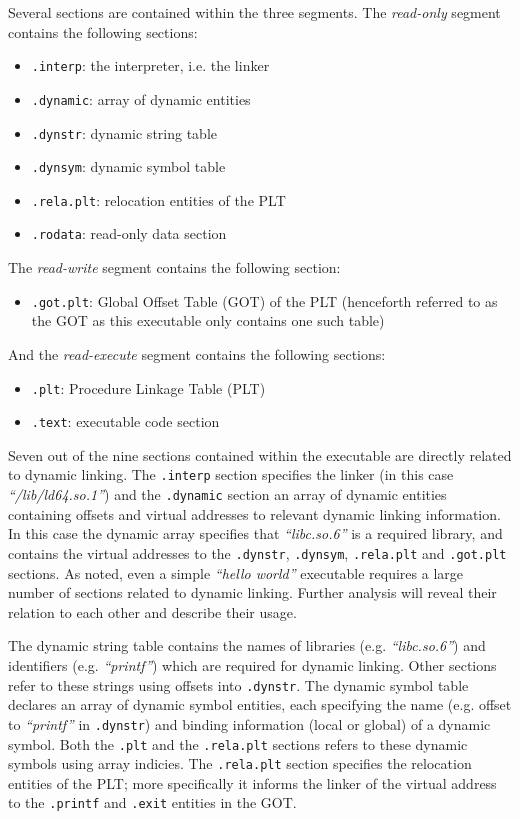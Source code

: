 Several sections are contained within the three segments. The \textit{read-only} segment contains the following sections:

\begin{itemize}
	\item \texttt{.interp}: the interpreter, i.e. the linker
	\item \texttt{.dynamic}: array of dynamic entities
	\item \texttt{.dynstr}: dynamic string table
	\item \texttt{.dynsym}: dynamic symbol table
	\item \texttt{.rela.plt}: relocation entities of the PLT
	\item \texttt{.rodata}: read-only data section
\end{itemize}

The \textit{read-write} segment contains the following section:

\begin{itemize}
	\item \texttt{.got.plt}: Global Offset Table (GOT) of the PLT (henceforth referred to as the GOT as this executable only contains one such table)
\end{itemize}

And the \textit{read-execute} segment contains the following sections:

\begin{itemize}
	\item \texttt{.plt}: Procedure Linkage Table (PLT)
	\item \texttt{.text}: executable code section
\end{itemize}

Seven out of the nine sections contained within the executable are directly related to dynamic linking. The \texttt{.interp} section specifies the linker (in this case \textit{``/lib/ld64.so.1''}) and the \texttt{.dynamic} section an array of dynamic entities containing offsets and virtual addresses to relevant dynamic linking information. In this case the dynamic array specifies that \textit{``libc.so.6''} is a required library, and contains the virtual addresses to the \texttt{.dynstr}, \texttt{.dynsym}, \texttt{.rela.plt} and \texttt{.got.plt} sections. As noted, even a simple \textit{``hello world''} executable requires a large number of sections related to dynamic linking. Further analysis will reveal their relation to each other and describe their usage.

The dynamic string table contains the names of libraries (e.g. \textit{``libc.so.6''}) and identifiers (e.g. \textit{``printf''}) which are required for dynamic linking. Other sections refer to these strings using offsets into \texttt{.dynstr}. The dynamic symbol table declares an array of dynamic symbol entities, each specifying the name (e.g. offset to \textit{``printf''} in \texttt{.dynstr}) and binding information (local or global) of a dynamic symbol. Both the \texttt{.plt} and the \texttt{.rela.plt} sections refers to these dynamic symbols using array indicies. The \texttt{.rela.plt} section specifies the relocation entities of the PLT; more specifically it informs the linker of the virtual address to the \texttt{.printf} and \texttt{.exit} entities in the GOT.

